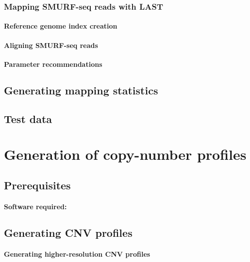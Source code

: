 \documentclass[11pt]{article}
\begin{document}
\subsubsection{Mapping SMURF-seq reads with LAST}
\paragraph{Reference genome index creation}

\paragraph{Aligning SMURF-seq reads}

\paragraph{Parameter recommendations}

\subsection{Generating mapping statistics}

\subsection{Test data}


\section{Generation of copy-number profiles}

\subsection{Prerequisites}
\paragraph{Software required:}

\subsection{Generating CNV profiles}

\paragraph{Generating higher-resolution CNV profiles}
\end{document}

